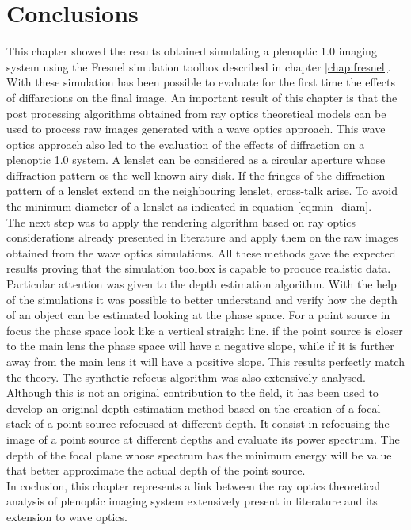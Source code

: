 \section{Conclusions}
This chapter showed the results obtained simulating a plenoptic 1.0 imaging system using the Fresnel simulation toolbox described in chapter \ref{chap:fresnel}. With these simulation has been possible to evaluate for the first time the effects of diffarctions on the final image. An important result of this chapter is that the post processing algorithms obtained from ray optics theoretical models can be used to process raw images generated with a wave optics approach. This wave optics approach also led to the evaluation of the effects of diffraction on a plenoptic 1.0 system. A lenslet can be considered as a circular aperture whose diffraction pattern os the well known airy disk. If the fringes of the diffraction pattern of a lenslet extend on the neighbouring lenslet, cross-talk arise. To avoid the minimum diameter of a lenslet as indicated in equation \ref{eq:min_diam}.\\
The next step was to apply the rendering algorithm based on ray optics considerations already presented in literature and apply them on the raw images obtained from the wave optics simulations. All these methods gave the expected results proving that the simulation toolbox is capable to procuce realistic data. Particular attention was given to the depth estimation algorithm. With the help of the simulations it was possible to better understand and verify how the depth of an object can be estimated looking at the phase space. For a point source in focus the phase space look like a vertical straight line. if the point source is closer to the main lens the phase space will have a negative slope, while if it is further away from the main lens it will have a positive slope. This results perfectly match the theory. The synthetic refocus algorithm was also extensively analysed. Although this is not an original contribution to the field, it has been used to develop an original depth estimation method based on the creation of a focal stack of a point source refocused at different depth. It consist in refocusing the image of a point source at different depths and evaluate its power spectrum. The depth of the focal plane whose spectrum has the minimum energy will be value that better approximate the actual depth of the point source.\\
In coclusion, this chapter represents a link between the ray optics theoretical analysis of plenoptic imaging system extensively present in literature and its extension to wave optics. 
